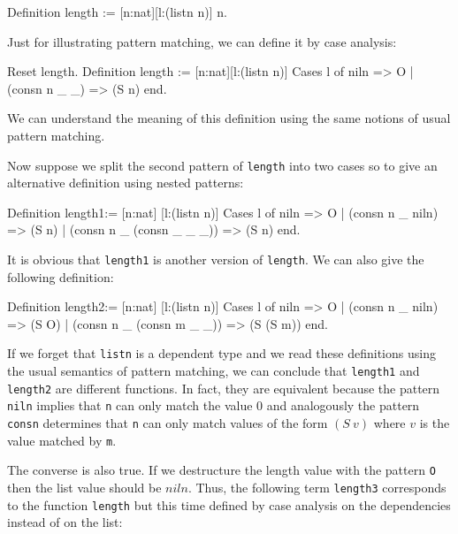 \begin{coq_example}
Definition length := [n:nat][l:(listn n)] n.
\end{coq_example}

Just for illustrating pattern matching, 
we can define it by case analysis:

\begin{coq_example}
Reset length.
Definition length := [n:nat][l:(listn n)]
                      Cases l of  
                         niln         => O 
                      | (consn n _ _) => (S n) 
                      end.
\end{coq_example}

We can understand the meaning of this definition using the
same notions of usual pattern matching.

%
%
\iffalse
Now suppose we split the second pattern  of \texttt{length} into two 
cases so to give an
alternative definition using nested patterns:
\begin{coq_example}
Definition length1:= [n:nat] [l:(listn n)]
   Cases l of 
        niln                   => O
   | (consn n _ niln)          => (S n)
   | (consn n _ (consn _ _ _)) => (S n)
  end.
\end{coq_example}

It is obvious that \texttt{length1} is  another version of
\texttt{length}. We can also give the following definition:
\begin{coq_example}
Definition length2:= [n:nat] [l:(listn n)]
 Cases l of 
     niln                    => O
 | (consn n _ niln)          => (S O)
 | (consn n _ (consn m _ _)) => (S (S m))
 end.
\end{coq_example}

If we forget that \texttt{listn} is a dependent type and we read these
definitions using the usual semantics of pattern matching,  we can conclude
that \texttt{length1}
and \texttt{length2} are different functions.
In fact, they are equivalent
because the pattern \texttt{niln} implies that \texttt{n} can only match
the value $0$ and analogously the pattern \texttt{consn} determines that \texttt{n} can
only match  values of the form  $(S~v)$ where $v$ is the value matched by
\texttt{m}. 

The converse is also true. If
we destructure the  length  value with the pattern \texttt{O} then the list
value should be $niln$. 
Thus, the following term \texttt{length3} corresponds to the function
\texttt{length} but this time defined by case analysis on the dependencies instead of on the list:

